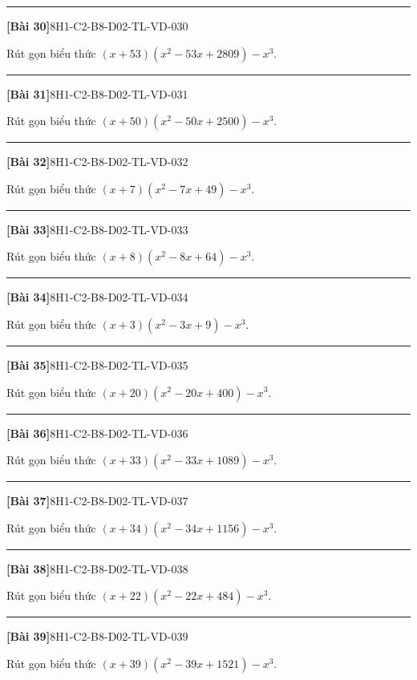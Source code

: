 \documentclass[12pt,a4paper]{article}
\newif\ifloigiai
\newenvironment{cauhoi}[2]{%
  \par\medskip\noindent\rule{\textwidth}{0.4pt}\par\nopagebreak
  \noindent\textbf{[#1]}\hfill{\scriptsize\ttfamily #2}\par\nopagebreak\smallskip}{\par}
\newcommand{\loigiai}[1]{\ifloigiai\par\smallskip\noindent\textit{Lời giải.} #1\par\fi}
\begin{document}
\begin{cauhoi}{Bài 30}{8H1-C2-B8-D02-TL-VD-030}
Rút gọn biểu thức $(x+53)(x^{2}-53x+2809)-x^{3}$.
\loigiai{Ta có $(x+53)(x^{2}-53x+2809)=x^{3}+148877$ nên biểu thức bằng $x^{3}+148877-x^{3}=148877$.}
\end{cauhoi}
\begin{cauhoi}{Bài 31}{8H1-C2-B8-D02-TL-VD-031}
Rút gọn biểu thức $(x+50)(x^{2}-50x+2500)-x^{3}$.
\loigiai{Ta có $(x+50)(x^{2}-50x+2500)=x^{3}+125000$ nên biểu thức bằng $x^{3}+125000-x^{3}=125000$.}
\end{cauhoi}
\begin{cauhoi}{Bài 32}{8H1-C2-B8-D02-TL-VD-032}
Rút gọn biểu thức $(x+7)(x^{2}-7x+49)-x^{3}$.
\loigiai{Ta có $(x+7)(x^{2}-7x+49)=x^{3}+343$ nên biểu thức bằng $x^{3}+343-x^{3}=343$.}
\end{cauhoi}
\begin{cauhoi}{Bài 33}{8H1-C2-B8-D02-TL-VD-033}
Rút gọn biểu thức $(x+8)(x^{2}-8x+64)-x^{3}$.
\loigiai{Ta có $(x+8)(x^{2}-8x+64)=x^{3}+512$ nên biểu thức bằng $x^{3}+512-x^{3}=512$.}
\end{cauhoi}
\begin{cauhoi}{Bài 34}{8H1-C2-B8-D02-TL-VD-034}
Rút gọn biểu thức $(x+3)(x^{2}-3x+9)-x^{3}$.
\loigiai{Ta có $(x+3)(x^{2}-3x+9)=x^{3}+27$ nên biểu thức bằng $x^{3}+27-x^{3}=27$.}
\end{cauhoi}
\begin{cauhoi}{Bài 35}{8H1-C2-B8-D02-TL-VD-035}
Rút gọn biểu thức $(x+20)(x^{2}-20x+400)-x^{3}$.
\loigiai{Ta có $(x+20)(x^{2}-20x+400)=x^{3}+8000$ nên biểu thức bằng $x^{3}+8000-x^{3}=8000$.}
\end{cauhoi}
\begin{cauhoi}{Bài 36}{8H1-C2-B8-D02-TL-VD-036}
Rút gọn biểu thức $(x+33)(x^{2}-33x+1089)-x^{3}$.
\loigiai{Ta có $(x+33)(x^{2}-33x+1089)=x^{3}+35937$ nên biểu thức bằng $x^{3}+35937-x^{3}=35937$.}
\end{cauhoi}
\begin{cauhoi}{Bài 37}{8H1-C2-B8-D02-TL-VD-037}
Rút gọn biểu thức $(x+34)(x^{2}-34x+1156)-x^{3}$.
\loigiai{Ta có $(x+34)(x^{2}-34x+1156)=x^{3}+39304$ nên biểu thức bằng $x^{3}+39304-x^{3}=39304$.}
\end{cauhoi}
\begin{cauhoi}{Bài 38}{8H1-C2-B8-D02-TL-VD-038}
Rút gọn biểu thức $(x+22)(x^{2}-22x+484)-x^{3}$.
\loigiai{Ta có $(x+22)(x^{2}-22x+484)=x^{3}+10648$ nên biểu thức bằng $x^{3}+10648-x^{3}=10648$.}
\end{cauhoi}
\begin{cauhoi}{Bài 39}{8H1-C2-B8-D02-TL-VD-039}
Rút gọn biểu thức $(x+39)(x^{2}-39x+1521)-x^{3}$.
\loigiai{Ta có $(x+39)(x^{2}-39x+1521)=x^{3}+59319$ nên biểu thức bằng $x^{3}+59319-x^{3}=59319$.}
\end{cauhoi}
\end{document}
